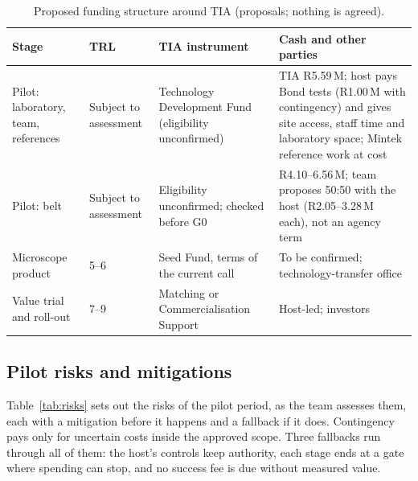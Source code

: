 \documentclass[10pt,a4paper,twocolumn]{article}
\begin{document}
\begin{table}[t]
\centering\footnotesize
\caption{Proposed funding structure around TIA (proposals; nothing is agreed).}
\label{tab:tia}
\begin{tabularx}{\columnwidth}{@{}L{1.3cm}L{0.75cm}L{1.95cm}Y@{}}
\toprule
Stage & TRL & TIA instrument & Cash and other parties \\
\midrule
Pilot: laboratory, team, references & Subject to assessment & Technology Development Fund (eligibility unconfirmed) & TIA R5.59\,M; host pays Bond tests (R1.00\,M with contingency) and gives site access, staff time and laboratory space; Mintek reference work at cost \\
Pilot: belt & Subject to assessment & Eligibility unconfirmed; checked before G0 & R4.10--6.56\,M; team proposes 50:50 with the host (R2.05--3.28\,M each), not an agency term \\
Microscope product & 5--6 & Seed Fund, terms of the current call & To be confirmed; technology-transfer office \\
Value trial and roll-out & 7--9 & Matching or Commercialisation Support & Host-led; investors \\
\bottomrule
\end{tabularx}
\end{table}

\subsection{Pilot risks and mitigations}\label{sec:risks}

Table~\ref{tab:risks} sets out the risks of the pilot period, as the team assesses them, each with a mitigation before it happens and a fallback if it does. Contingency pays only for uncertain costs inside the approved scope. Three fallbacks run through all of them: the host's controls keep authority, each stage ends at a gate where spending can stop, and no success fee is due without measured value.
\end{document}
